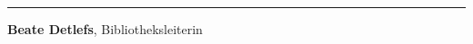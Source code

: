 \begin{center}\rule{0.5\linewidth}{\linethickness}\end{center}

\textbf{Beate Detlefs}, Bibliotheksleiterin
